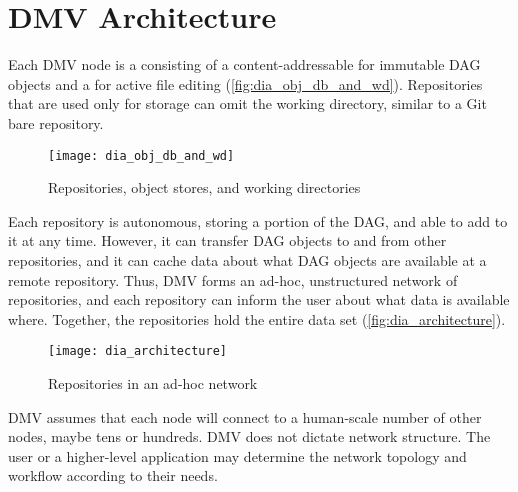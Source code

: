 \chapter{DMV Architecture}

Each DMV node is a  consisting of a content-addressable
 for immutable DAG objects and a  for active file editing (\autoref{fig:dia_obj_db_and_wd}).
Repositories that are used only for storage can omit the working directory,
similar to a Git bare repository.

\begin{figure}[h]
  \centering
    \texttt{[image: dia\_obj\_db\_and\_wd]}
  \caption{Repositories, object stores, and working directories}
  \label{fig:dia_obj_db_and_wd}
\end{figure}

Each repository is autonomous, storing a portion of the DAG, and able to add to
it at any time. However, it can transfer DAG objects to and from other
repositories, and it can cache data about what DAG objects are available at a
remote repository. Thus, DMV forms an ad-hoc, unstructured network of
repositories, and each repository can inform the user about what data is
available where. Together, the repositories hold the entire data set
(\autoref{fig:dia_architecture}).

\begin{figure}[h]
  \centering
    \texttt{[image: dia\_architecture]}
  \caption{Repositories in an ad-hoc network}
  \label{fig:dia_architecture}
\end{figure}

DMV assumes that each node will connect to a human-scale number of other nodes,
maybe tens or hundreds. DMV does not dictate network structure. The user or a
higher-level application may determine the network topology and workflow
according to their needs.
